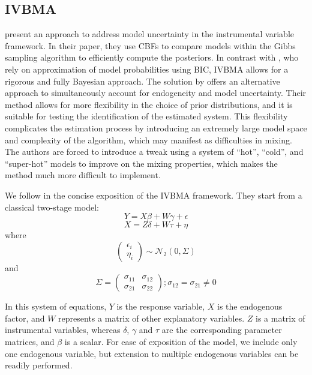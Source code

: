 \begin{refsection}
\subsection*{\ac{IVBMA}}
\textcite{KarlLenkoski2012} present an approach to address model uncertainty in the instrumental variable framework. In their paper, they use \acp{CBF} to compare models within the Gibbs sampling algorithm to efficiently compute the posteriors. In contrast with \textcite{lenkoski2014two}, who rely on approximation of model probabilities using \ac{BIC}, \ac{IVBMA} allows for a rigorous and fully Bayesian approach. The solution by \textcite{koop2012bayesian} offers an alternative approach to simultaneously account for endogeneity and model uncertainty. Their method allows for more flexibility in the choice of prior distributions, and it is suitable for testing the identification of the estimated system. This flexibility complicates the estimation process by introducing an extremely large model space and complexity of the algorithm, which may manifest as difficulties in mixing. The authors are forced to introduce a tweak using a system of ``hot'', ``cold'', and ``super-hot'' models to improve on the mixing properties, which makes the method much more difficult to implement.

We follow \textcite{KarlLenkoski2012} in the concise exposition of the \ac{IVBMA} framework. They start from a classical two-stage model:
\begin{equation}\label{ch3eq:ivbma1}
{Y} = {X} \beta + {W} \gamma + {\epsilon}
\end{equation}
%
\begin{equation}\label{ch3eq:ivbma2}
{X} = {Z} {\delta} + {W} {\tau} + {\eta}
\end{equation}
%
where
%
\begin{equation}
\begin{pmatrix}
\epsilon_{i} \\
\eta_{i}
\end{pmatrix}
\sim \mathcal{N}_{2}(0, {\Sigma})
\end{equation}
%
and
%
\begin{equation}
{\Sigma} = 
\begin{pmatrix}
 \sigma_{11} & \sigma_{12} \\
 \sigma_{21} & \sigma_{22}
\end{pmatrix}
; \sigma_{12} = \sigma_{21} \neq 0
\end{equation}

In this system of equations, ${Y}$ is the response variable, ${X}$ is the endogenous factor, and ${W}$ represents a matrix of other explanatory variables. ${Z}$ is a matrix of instrumental variables, whereas ${\delta}$, ${\gamma}$ and ${\tau}$ are the corresponding parameter matrices, and $\beta$ is a scalar. For ease of exposition of the model, we include only one endogenous variable, but extension to multiple endogenous variables can be readily performed.


\end{refsection}
